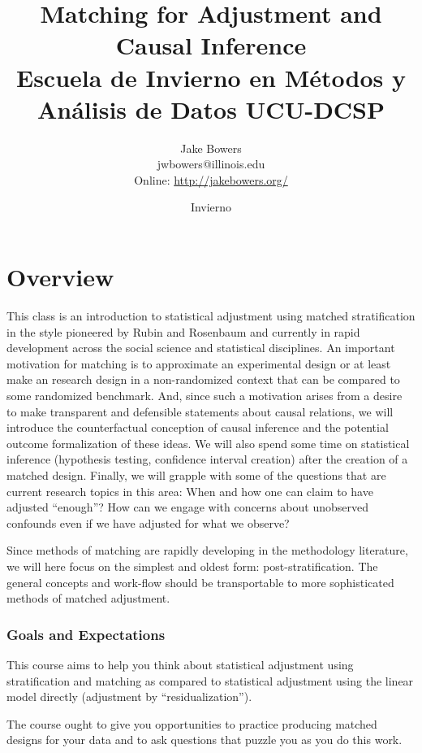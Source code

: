 \documentclass[10pt, letterpaper]{article}
\title{Matching for Adjustment and Causal Inference \\
  Escuela de Invierno en M\'{e}todos y An\'{a}lisis de Datos UCU-DCSP }
\author{Jake Bowers \\
  \small{jwbowers@illinois.edu \\
    Online:
    \url{http://jakebowers.org/}}
}
\date{Invierno \the\year}
\makeatletter
\newenvironment{introstuff} {\setcounter{secnumdepth}{0}%
} {\setcounter{secnumdepth}{1}%
\restoregeometry
}
\def\maketitle{%
  \thispagestyle{empty}%
  \begin{center}\leavevmode
    \normalfont
    {\large \bfseries\@title\par}%
    {\large \@author\par}%
    {\large \@date\par}%
  \end{center}%
  \null }
\makeatother
\begin{document}
\pagestyle{myfancy}

\begin{introstuff}

\maketitle

  \part{Overview}

  This class is an introduction to statistical adjustment using matched
  stratification in the style pioneered by Rubin and Rosenbaum and currently in
  rapid development across the social science and statistical disciplines. An
  important motivation for matching is to approximate an experimental design or
  at least make an research design in a non-randomized context that can be
  compared to some randomized benchmark. And, since such a motivation arises
  from a desire to make transparent and defensible statements about causal
  relations, we will introduce the counterfactual conception of causal
  inference and the potential outcome formalization of these ideas. We will
  also spend some time on statistical inference (hypothesis testing, confidence
  interval creation) after the creation of a matched design. Finally, we will
  grapple with some of the questions that are current research topics in this
  area: When and how one can claim to have adjusted ``enough''? How can we
  engage with concerns about unobserved confounds even if we have adjusted for
  what we observe?

  Since methods of matching are rapidly developing in the methodology
  literature, we will here focus on the simplest and oldest form:
  post-stratification. The general concepts and work-flow should be
  transportable to more sophisticated methods of matched adjustment.

  \section{Goals and Expectations}

  This course aims to help you think about statistical adjustment using
  stratification and matching as compared to statistical adjustment using the
  linear model directly (adjustment by ``residualization'').

  The course ought to give you opportunities to practice producing
  matched designs for your data and to ask questions that puzzle you as
  you do this work.


\end{introstuff}
\end{document}
